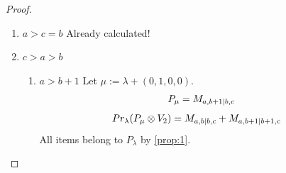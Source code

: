 \documentclass[12pt,a4paper]{article}
\begin{document}
\begin{proof}
\begin{enumerate}
\begin{enumerate}
  \item $c=b+1, a>c+1$
        Let $\mu:=\lambda + (0,0,1,1) $. 
\begin{equation}\notag
  \begin{aligned}
      P_{\mu} =M_{a,b|b+1,b+2}
M_{a,b+1|b,c}
  \end{aligned}
\end{equation}
\begin{equation}\notag
  \begin{aligned}
  Pr_{\lambda}(P_\mu \otimes V_3) &=
M_{a,b|b,b+1}
+M_{a,b+1|b+1,b+1}
+M_{a,b+2|b+1,b+2}
  \end{aligned}
\end{equation}
All items belong to $P_\lambda$ by \cref{prop:1}.

  \item $c=b+1, a=c+1$
        Let $\mu:=\lambda + (1,0,0,0) $. 
\begin{equation}\notag
  \begin{aligned}
      P_{\mu} =
M_{b+3,b|b,b+1}
+M_{b+3,b+1|b+1,b+1}
+M_{b+3,b+2|b+1,b+2}
M_{a,b+1|b,c}
  \end{aligned}
\end{equation}
\begin{equation}\notag
  \begin{aligned}
  Pr_{\lambda}(P_\mu \otimes V_2) &=
M_{b+2,b|b,b+1}
+M_{b+2,b+1|b+1,b+1}
+M_{b+2,b+2|b+1,b+2}
+M_{b+3,b+2|b+1,b+3}
  \end{aligned}
\end{equation}
By \cref{prop:1} and \cref{lemma:2}, all terms except $M_{b+3,b+2|b+1,b+3}$ must belong to $P_\lambda$. Since $M_{b+4,b+2|b+1,b+4}$ must appear in $P_{b+3,b+2|b+1,b+3}$ by \cref{prop:1},  the one remaining term cannot form a projective, it must also belong to $P_\lambda$.
\end{enumerate}

\item $a>c=b$ Already calculated!

\item $c>a>b$
  \begin{enumerate}
    \item $a>b+1$
        Let $\mu:=\lambda + (0,1,0,0) $. 
\begin{equation}\notag
  \begin{aligned}
      P_{\mu} =
      M_{a,b+1|b,c}
  \end{aligned}
\end{equation}
\begin{equation}\notag
  \begin{aligned}
  Pr_{\lambda}(P_\mu \otimes V_2) &=
M_{a,b|b,c}
+M_{a,b+1|b+1,c}
  \end{aligned}
\end{equation}
All items belong to $P_\lambda$ by \cref{prop:1}.


\end{enumerate}
\end{enumerate}
\end{proof}
\end{document}
